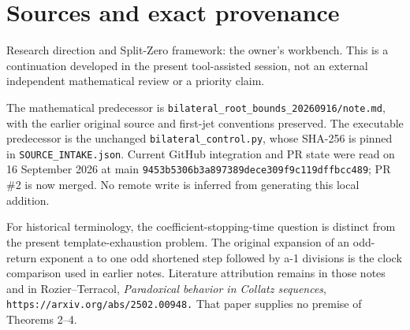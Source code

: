 \section{Sources and exact provenance}

Research direction and Split-Zero framework: the owner's workbench. This
is a continuation developed in the present tool-assisted session, not an
external independent mathematical review or a priority claim.

The mathematical predecessor is
\nolinkurl{bilateral_root_bounds_20260916/note.md}, with the earlier
original source and first-jet conventions preserved. The executable
predecessor is the unchanged \nolinkurl{bilateral_control.py}, whose
SHA-256 is pinned in \nolinkurl{SOURCE_INTAKE.json}. Current GitHub
integration and PR state were read on 16 September 2026 at main
\nolinkurl{9453b5306b3a897389dece309f9c119dffbcc489}; PR \#2 is now
merged. No remote write is inferred from generating this local addition.

For historical terminology, the coefficient-stopping-time question is
distinct from the present template-exhaustion problem. The original
expansion of an odd-return exponent a to one odd shortened step followed
by a-1 divisions is the clock comparison used in earlier notes.
Literature attribution remains in those notes and in Rozier--Terracol,
\emph{Paradoxical behavior in Collatz sequences},
\nolinkurl{https://arxiv.org/abs/2502.00948.} That paper supplies no
premise of Theorems 2--4.
